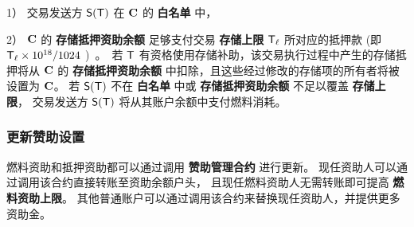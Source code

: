 1） 交易发送方 $\mathsf{S} (\textsf{T})$ 在 $\mathbf{C}$ 的 \textbf{白名单} 中，

2） $\mathbf{C}$ 的 {\bf 存储抵押资助余额} 足够支付交易 {\bf 存储上限} $\textsf{T}_\ell$ 所对应的抵押款 (即 $\textsf{T}_\ell\times10^{18}/{1024}$ \unit)。

若 $\textsf{T}$ 有资格使用存储补助，该交易执行过程中产生的存储抵押将从 $\mathbf{C}$ 的 \textbf{存储抵押资助余额} 中扣除，且这些经过修改的存储项的所有者将被设置为 $\mathbf{C}$。
若 $\mathsf{S}{\left({\textsf{T}} \right)}$ 不在 \textbf{白名单} 中或 \textbf{存储抵押资助余额} 不足以覆盖 {\bf 存储上限}， 交易发送方 $\mathsf{S}{\left({\textsf{T}} \right)}$ 将从其账户余额中支付燃料消耗。


\subsubsection{更新赞助设置}

燃料资助和抵押资助都可以通过调用 \textbf{赞助管理合约} 进行更新。
现任资助人可以通过调用该合约直接转账至资助余额户头，
且现任燃料资助人无需转账即可提高 \textbf{燃料资助上限}。
其他普通账户可以通过调用该合约来替换现任资助人，并提供更多资助金。



